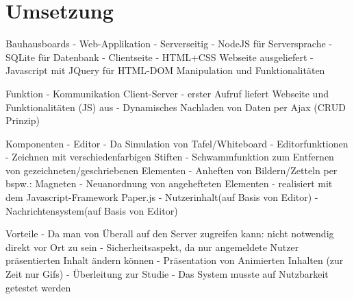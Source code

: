 \documentclass[11pt]{beamer}
\begin{document}


\section{Umsetzung}
\begin{frame}{Bauhausboards}
  - Web-Applikation
    - Serverseitig
      - NodeJS für Serversprache
      - SQLite für Datenbank
    - Clientseite
      - HTML+CSS Webseite ausgeliefert
      - Javascript mit JQuery für HTML-DOM Manipulation und Funktionalitäten
\end{frame}
\begin{frame}{Funktion}
    - Kommunikation Client-Server
      - erster Aufruf liefert Webseite und Funktionalitäten (JS) aus
      - Dynamisches Nachladen von Daten per Ajax (CRUD Prinzip)
\end{frame}
\begin{frame}{Komponenten}
      - Editor - Da Simulation von Tafel/Whiteboard
        - Editorfunktionen
          - Zeichnen mit verschiedenfarbigen Stiften
          - Schwammfunktion zum Entfernen von gezeichneten/geschriebenen Elementen
          - Anheften von Bildern/Zetteln per bspw.: Magneten
          - Neuanordnung von angehefteten Elementen
        - realisiert mit dem Javascript-Framework Paper.js
      - Nutzerinhalt(auf Basis von Editor)
      - Nachrichtensystem(auf Basis von Editor)
\end{frame}
\begin{frame}{Vorteile}
      - Da man von Überall auf den Server zugreifen kann: nicht notwendig direkt vor Ort zu sein
      - Sicherheitsaspekt, da nur angemeldete Nutzer präsentierten Inhalt ändern können
      - Präsentation von Animierten Inhalten (zur Zeit nur Gifs)
  - Überleitung zur Studie
    - Das System musste auf Nutzbarkeit getestet werden
\end{frame}
\end{document}
